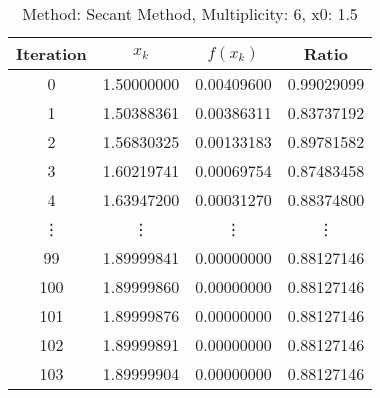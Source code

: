 \begin{table}
\centering
\caption{Method: Secant Method, Multiplicity: 6, x0: 1.5}
\label{tab:table_Secant_Method_6_1_5}
\begin{tabular}{c c c c}
\toprule
Iteration &      $x_k$ &   $f(x_k)$ &      Ratio \\
\midrule
        0 & 1.50000000 & 0.00409600 & 0.99029099 \\
        1 & 1.50388361 & 0.00386311 & 0.83737192 \\
        2 & 1.56830325 & 0.00133183 & 0.89781582 \\
        3 & 1.60219741 & 0.00069754 & 0.87483458 \\
        4 & 1.63947200 & 0.00031270 & 0.88374800 \\
   \vdots &     \vdots &     \vdots &     \vdots \\
       99 & 1.89999841 & 0.00000000 & 0.88127146 \\
      100 & 1.89999860 & 0.00000000 & 0.88127146 \\
      101 & 1.89999876 & 0.00000000 & 0.88127146 \\
      102 & 1.89999891 & 0.00000000 & 0.88127146 \\
      103 & 1.89999904 & 0.00000000 & 0.88127146 \\
\bottomrule
\end{tabular}
\end{table}
